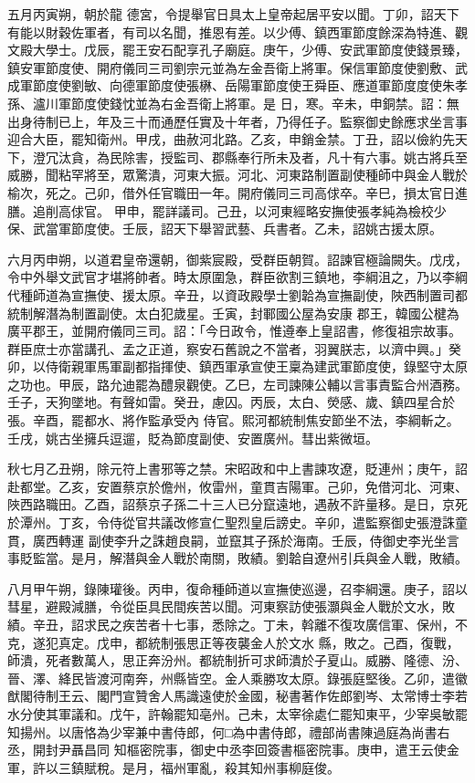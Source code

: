 \begin{pinyinscope}
 五月丙寅朔，朝於龍
 德宮，令提舉官日具太上皇帝起居平安以聞。丁卯，詔天下有能以財穀佐軍者，有司以名聞，推恩有差。以少傅、鎮西軍節度餘深為特進、觀文殿大學士。戊辰，罷王安石配享孔子廟庭。庚午，少傅、安武軍節度使錢景臻，鎮安軍節度使、開府儀同三司劉宗元並為左金吾衛上將軍。保信軍節度使劉敷、武成軍節度使劉敏、向德軍節度使張楙、岳陽軍節度使王舜臣、應道軍節度度使朱孝孫、瀘川軍節度使錢忱並為右金吾衛上將軍。是
 日，寒。辛未，申銅禁。詔：無出身待制已上，年及三十而通歷任實及十年者，乃得任子。監察御史餘應求坐言事迎合大臣，罷知衛州。甲戌，曲赦河北路。乙亥，申銷金禁。丁丑，詔以儉約先天下，澄冗汰貪，為民除害，授監司、郡縣奉行所未及者，凡十有六事。姚古將兵至威勝，聞粘罕將至，眾驚潰，河東大振。河北、河東路制置副使種師中與金人戰於榆次，死之。己卯，借外任官職田一年。開府儀同三司高俅卒。辛巳，損太官日進膳。追削高俅官。
 甲申，罷詳議司。己丑，以河東經略安撫使張孝純為檢校少保、武當軍節度使。壬辰，詔天下舉習武藝、兵書者。乙未，詔姚古援太原。



 六月丙申朔，以道君皇帝還朝，御紫宸殿，受群臣朝賀。詔諫官極論闕失。戊戌，令中外舉文武官才堪將帥者。時太原圍急，群臣欲割三鎮地，李綱沮之，乃以李綱代種師道為宣撫使、援太原。辛丑，以資政殿學士劉韐為宣撫副使，陜西制置司都統制解潛為制置副使。太白犯歲星。壬寅，封鄆國公屋為安康
 郡王，韓國公楗為廣平郡王，並開府儀同三司。詔：「今日政令，惟遵奉上皇詔書，修復祖宗故事。群臣庶士亦當講孔、孟之正道，察安石舊說之不當者，羽翼朕志，以濟中興。」癸卯，以侍衛親軍馬軍副都指揮使、鎮西軍承宣使王稟為建武軍節度使，錄堅守太原之功也。甲辰，路允迪罷為醴泉觀使。乙巳，左司諫陳公輔以言事責監合州酒務。壬子，天狗墜地。有聲如雷。癸丑，慮囚。丙辰，太白、熒感、歲、鎮四星合於張。辛酉，罷都水、將作監承受內
 侍官。熙河都統制焦安節坐不法，李綱斬之。壬戌，姚古坐擁兵逗遛，貶為節度副使、安置廣州。彗出紫微垣。



 秋七月乙丑朔，除元符上書邪等之禁。宋昭政和中上書諫攻遼，貶連州；庚午，詔赴都堂。乙亥，安置蔡京於儋州，攸雷州，童貫吉陽軍。己卯，免借河北、河東、陜西路職田。乙酉，詔蔡京子孫二十三人已分竄遠地，遇赦不許量移。是日，京死於潭州。丁亥，令侍從官共議改修宣仁聖烈皇后謗史。辛卯，遣監察御史張澄誅童貫，廣西轉運
 副使李升之誅趙良嗣，並竄其子孫於海南。壬辰，侍御史李光坐言事貶監當。是月，解潛與金人戰於南關，敗績。劉韐自遼州引兵與金人戰，敗績。



 八月甲午朔，錄陳瓘後。丙申，復命種師道以宣撫使巡邊，召李綱還。庚子，詔以彗星，避殿減膳，令從臣具民間疾苦以聞。河東察訪使張灝與金人戰於文水，敗績。辛丑，詔求民之疾苦者十七事，悉除之。丁未，斡離不復攻廣信軍、保州，不克，遂犯真定。戊申，都統制張思正等夜襲金人於文水
 縣，敗之。己酉，復戰，師潰，死者數萬人，思正奔汾州。都統制折可求師潰於子夏山。威勝、隆德、汾、晉、澤、絳民皆渡河南奔，州縣皆空。金人乘勝攻太原。錄張庭堅後。乙卯，遣徽猷閣待制王云、閣門宣贊舍人馬識遠使於金國，秘書著作佐郎劉岑、太常博士李若水分使其軍議和。戊午，許翰罷知亳州。己未，太宰徐處仁罷知東平，少宰吳敏罷知揚州。以唐恪為少宰兼中書侍郎，何□為中書侍郎，禮部尚書陳過庭為尚書右丞，開封尹聶昌同
 知樞密院事，御史中丞李回簽書樞密院事。庚申，遣王云使金軍，許以三鎮賦稅。是月，福州軍亂，殺其知州事柳庭俊。




\end{pinyinscope}

